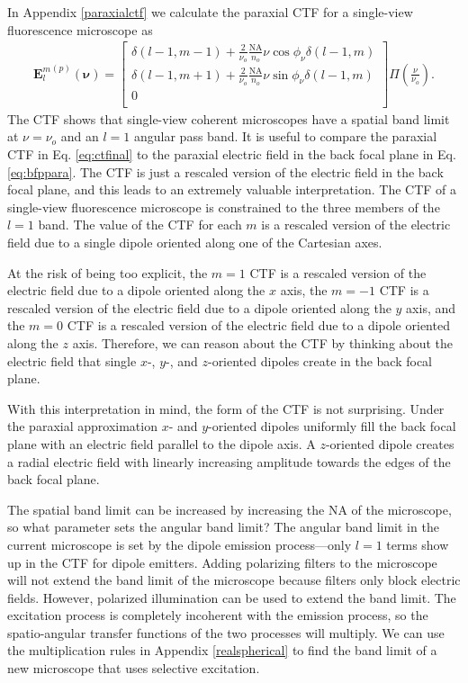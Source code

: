 \documentclass[11pt]{article}
\providecommand{\mb}[1]{\mathbf{#1}}
\providecommand{\bs}[1]{\boldsymbol{#1}}
\begin{document}
In Appendix \ref{paraxialctf} we calculate the paraxial CTF for a single-view fluorescence microscope as 
\begin{align}
  {\mb{E}_l^m}^{(p)}(\bs{\nu}) =
\begin{bmatrix}
  \delta(l-1, m-1) + \frac{2}{\nu_o}\frac{\text{NA}}{n_o}\nu\cos\phi_\nu\delta(l-1, m)\\
  \delta(l-1, m+1) + \frac{2}{\nu_o}\frac{\text{NA}}{n_o}\nu\sin\phi_\nu\delta(l-1, m)\\
  0\\
  \end{bmatrix}\Pi\left(\frac{\nu}{\nu_o}\right).\label{eq:ctfinal}
\end{align}
The CTF shows that single-view coherent microscopes have a spatial band limit at
$\nu = \nu_o$ and an $l=1$ angular pass band. It is useful to compare the paraxial
CTF in Eq. \ref{eq:ctfinal} to the paraxial electric field in the back focal
plane in Eq. \ref{eq:bfppara}. The CTF is just a rescaled version of the
electric field in the back focal plane, and this leads to an extremely valuable
interpretation. The CTF of a single-view fluorescence microscope is constrained
to the three members of the $l=1$ band. The value of the CTF for each $m$ is a
rescaled version of the electric field due to a single dipole oriented along one
of the Cartesian axes.

At the risk of being too explicit, the $m=1$ CTF is a rescaled version of the
electric field due to a dipole oriented along the $x$ axis, the $m=-1$ CTF is a
rescaled version of the electric field due to a dipole oriented along the $y$
axis, and the $m=0$ CTF is a rescaled version of the electric field due to a
dipole oriented along the $z$ axis. Therefore, we can reason about the CTF by
thinking about the electric field that single $x$-, $y$-, and $z$-oriented dipoles
create in the back focal plane. 

With this interpretation in mind, the form of the CTF is not surprising. Under
the paraxial approximation $x$- and $y$-oriented dipoles uniformly fill the back
focal plane with an electric field parallel to the dipole axis. A $z$-oriented
dipole creates a radial electric field with linearly increasing amplitude towards
the edges of the back focal plane.

The spatial band limit can be increased by increasing the NA of the microscope,
so what parameter sets the angular band limit? The angular band limit in the
current microscope is set by the dipole emission process---only $l=1$ terms show
up in the CTF for dipole emitters. Adding polarizing filters to the microscope
will not extend the band limit of the microscope because filters only block
electric fields. However, polarized illumination can be used to extend the band
limit. The excitation process is completely incoherent with the emission
process, so the spatio-angular transfer functions of the two processes will
multiply. We can use the multiplication rules in Appendix \ref{realspherical} to
find the band limit of a new microscope that uses selective excitation.
\end{document}
